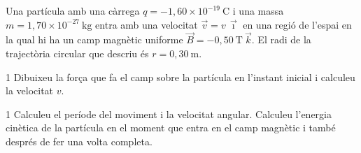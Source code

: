 Una partícula amb una càrrega $q = -1,60\times 10^{-19}\ \mathrm{C}$ i una massa $m = 1,70\times 10^{-27}\ \mathrm{kg}$ entra amb una velocitat $\vec{v} = v\,\vec{\imath}$ en una regió de l'espai en la qual hi ha un camp magnètic uniforme $\vec{B} = -0,50\ \mathrm{T}\ \vec{k}$. El radi de la trajectòria circular que descriu és $r = 0,30\ \mathrm{m}$.


\begin{apartat}{1}
Dibuixeu la força que fa el camp sobre la partícula en l'instant inicial i calculeu la velocitat $v$.
\end{apartat}

\begin{apartat}{1}
Calculeu el període del moviment i la velocitat angular. Calculeu l'energia cinètica de la partícula en el moment que entra en el camp magnètic i també després de fer una volta completa.
\end{apartat}
